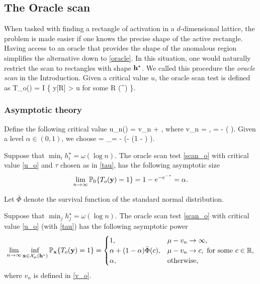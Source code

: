 \documentclass[twoside,11pt]{article}
\begin{document}
\subsection{The Oracle scan}

When tasked with finding a rectangle of activation in a $d$-dimensional lattice, the problem is made easier if one knows the precise shape of the active rectangle.
Having access to an oracle that provides the shape of the anomalous region simplifies the alternative down to \eqref{oracle}.
In this situation, one would naturally restrict the scan to rectangles with shape $\mathbf{h}^\star$.  
We called this procedure the {\em oracle scan} in the Introduction.
%
Given a critical value $u$, the oracle scan test is defined as
\beq \label{scan_o}
T_o(\yb) = I \big\{ y[R] > u \textrm{ for some } R \in \Rcal(\hb^\star) \big\}.
\eeq

\subsubsection{Asymptotic theory}
Define the following critical value 
\beq \label{u_o}
u_n(\tau) = v_n + ,
\eeq
where 
\beq \label{v_o}
v_n = , \quad \kappa = - \log ( \sqrt{2\pi} ).
\eeq
Given a level $\alpha \in (0,1)$, we choose 
\beq \label{tau}
\tau = \tau_\alpha = - \log (- \log (1 - \alpha) ).  
\eeq

\begin{theorem}
\label{thm:oracle_type1}
Suppose that $\min_i h_i^\star = \omega(\log n)$. 
The oracle scan test \eqref{scan_o} with critical value \eqref{u_o} and $\tau$ chosen as in \eqref{tau}, has the following asymptotic size 
\[ 
\lim_{n \rightarrow \infty} \mathbb{P}_0 \{T_o(\mathbf{y}) = 1\} = 1 - e^{-e^{-\tau}} = \alpha.
\]
\end{theorem}


Let $\bar\Phi$ denote the survival function of the standard normal distribution. 

\begin{theorem}
\label{thm:oracle_type2}
Suppose that $\min_j h_j^\star = \omega(\log n)$. 
The oracle scan test \eqref{scan_o} with critical value \eqref{u_o} (with \eqref{tau}) has the following asymptotic power 
\[
\lim_{n \rightarrow \infty} \inf_{\mathbf{x} \in \mathcal{X}_\mu(\mathbf{h}^\star)} \mathbb{P}_{\mathbf{x}} \{ T_o(\mathbf{y}) = 1 \} = 
\begin{cases}
1, &\mu - v_n \rightarrow \infty,\\
\alpha + (1 - \alpha) \bar\Phi(c), &\mu - v_n \rightarrow c, \textrm{ for some } c \in \mathbb{R},\\
\alpha, &\textrm{otherwise},
\end{cases}\]
where $v_n$ is defined in \eqref{v_o}.
\end{theorem}
\end{document}

